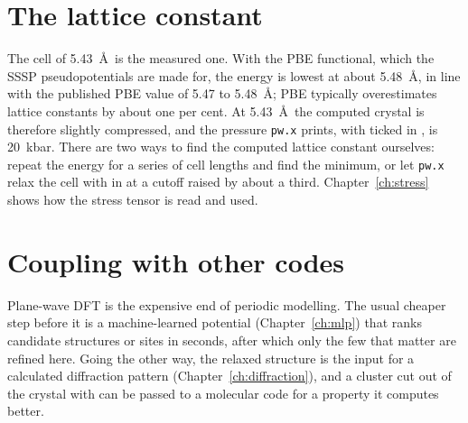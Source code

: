 \section{The lattice constant}
The cell of 5.43~\AA\ is the measured one. With the PBE functional, which the SSSP pseudopotentials are made for, the energy is lowest at about 5.48~\AA, in line with the published PBE value of 5.47 to 5.48~\AA; PBE typically overestimates lattice constants by about one per cent. At 5.43~\AA\ the computed crystal is therefore slightly compressed, and the pressure \texttt{pw.x} prints, with  ticked in , is 20~kbar. There are two ways to find the computed lattice constant ourselves: repeat the energy for a series of cell lengths and find the minimum, or let \texttt{pw.x} relax the cell with  in  at a cutoff raised by about a third. Chapter~\ref{ch:stress} shows how the stress tensor is read and used.

\section{Coupling with other codes}
Plane-wave DFT is the expensive end of periodic modelling. The usual cheaper step before it is a machine-learned potential (Chapter~\ref{ch:mlp}) that ranks candidate structures or sites in seconds, after which only the few that matter are refined here. Going the other way, the relaxed structure is the input for a calculated diffraction pattern (Chapter~\ref{ch:diffraction}), and a cluster cut out of the crystal with  can be passed to a molecular code for a property it computes better.
